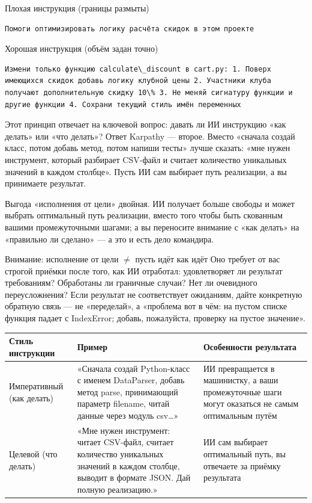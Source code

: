 Плохая инструкция (границы размыты)

\begin{lstlisting}
Помоги оптимизировать логику расчёта скидок в этом проекте
\end{lstlisting}

Хорошая инструкция (объём задан точно)

\begin{lstlisting}
Измени только функцию calculate\_discount в cart.py: 1. Поверх имеющихся скидок добавь логику клубной цены 2. Участники клуба получают дополнительную скидку 10\% 3. Не меняй сигнатуру функции и другие функции 4. Сохрани текущий стиль имён переменных
\end{lstlisting}


Этот принцип отвечает на ключевой вопрос: давать ли ИИ инструкцию «как делать» или «что делать»? Ответ Karpathy — второе. Вместо «сначала создай класс, потом добавь метод, потом напиши тесты» лучше сказать: «мне нужен инструмент, который разбирает CSV-файл и считает количество уникальных значений в каждом столбце». Пусть ИИ сам выбирает путь реализации, а вы принимаете результат.

Выгода «исполнения от цели» двойная. ИИ получает больше свободы и может выбрать оптимальный путь реализации, вместо того чтобы быть скованным вашими промежуточными шагами; а вы переносите внимание с «как делать» на «правильно ли сделано» — а это и есть дело командира.

\begin{tcbwarn}{Внимание: исполнение от цели $\neq$ пусть идёт как идёт}
Оно требует от вас строгой приёмки после того, как ИИ отработал: удовлетворяет ли результат требованиям? Обработаны ли граничные случаи? Нет ли очевидного переусложнения? Если результат не соответствует ожиданиям, дайте конкретную обратную связь — не «переделай», а «проблема вот в чём: на пустом списке функция падает с IndexError; добавь, пожалуйста, проверку на пустое значение».

\end{tcbwarn}

\begin{center}
\begin{tabularx}{\linewidth}{|X|X|X|}
\hline
\textbf{Стиль инструкции} & \textbf{Пример} & \textbf{Особенности результата} \tabularnewline
\hline
Императивный (как делать) & «Сначала создай Python-класс с именем DataParser, добавь метод parse, принимающий параметр filename, читай данные через модуль csv…» & ИИ превращается в машинистку, а ваши промежуточные шаги могут оказаться не самым оптимальным путём \tabularnewline
Целевой (что делать) & «Мне нужен инструмент: читает CSV-файл, считает количество уникальных значений в каждом столбце, выводит в формате JSON. Дай полную реализацию.» & ИИ сам выбирает оптимальный путь, вы отвечаете за приёмку результата \tabularnewline
\hline
\end{tabularx}
\end{center}


